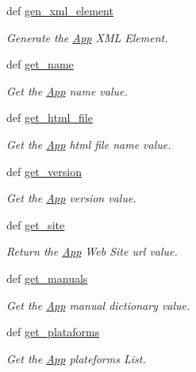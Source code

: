 \begin{CompactItemize}
def \hyperlink{classwinsollib_1_1App_7b11c08aec59fb9148cffb97c26e7aa2}{gen\_\-xml\_\-element}
\begin{CompactList}\small\item\em Generate the \hyperlink{classwinsollib_1_1App}{App} XML Element. \item\end{CompactList}\item 
def \hyperlink{classwinsollib_1_1App_e8350e6e153e7acbe1dfb50b6b876512}{get\_\-name}
\begin{CompactList}\small\item\em Get the \hyperlink{classwinsollib_1_1App}{App} name value. \item\end{CompactList}\item 
def \hyperlink{classwinsollib_1_1App_369d463c4b77a4d98f449a4223bd03e3}{get\_\-html\_\-file}
\begin{CompactList}\small\item\em Get the \hyperlink{classwinsollib_1_1App}{App} html file name value. \item\end{CompactList}\item 
def \hyperlink{classwinsollib_1_1App_822a56876d4b800de1139cc556b33b9d}{get\_\-version}
\begin{CompactList}\small\item\em Get the \hyperlink{classwinsollib_1_1App}{App} version value. \item\end{CompactList}\item 
def \hyperlink{classwinsollib_1_1App_7fe30d22b3992092349061f1692edb3e}{get\_\-site}
\begin{CompactList}\small\item\em Return the \hyperlink{classwinsollib_1_1App}{App} Web Site url value. \item\end{CompactList}\item 
def \hyperlink{classwinsollib_1_1App_fc82d66adfb3400eecd4395c455353d8}{get\_\-manuals}
\begin{CompactList}\small\item\em Get the \hyperlink{classwinsollib_1_1App}{App} manual dictionary value. \item\end{CompactList}\item 
def \hyperlink{classwinsollib_1_1App_897de56ff07a039d94bace089a75224f}{get\_\-plataforms}
\begin{CompactList}\small\item\em Get the \hyperlink{classwinsollib_1_1App}{App} plateforms List. \item\end{CompactList}\item 

\end{CompactItemize}
